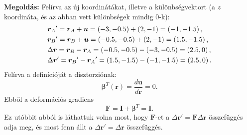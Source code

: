 \documentclass[12pt,a4paper]{scrartcl}
\let\mathbf\bm
\begin{document}
\textbf{Megoldás:} Felírva az új koordinátákat, illetve a különbségvektort (a $z$ koordináta, és az abban vett különbségek mindig 0-k):
\[\begin{gathered}
  {{\mathbf{r}}_A}' = {{\mathbf{r}}_A} + {\mathbf{u}} = \left( { - 3, - 0.5} \right) + \left( {2, - 1} \right) = \left( { - 1, - 1.5} \right), \hfill \\
  {{\mathbf{r}}_B}' = {{\mathbf{r}}_B} + {\mathbf{u}} = \left( { - 0.5, - 0.5} \right) + \left( {2, - 1} \right) = \left( {1.5, - 1.5} \right), \hfill \\
  \Delta {\mathbf{r}} = {{\mathbf{r}}_B} - {{\mathbf{r}}_A} = \left( { - 0.5, - 0.5} \right) - \left( { - 3, - 0.5} \right) = \left( {2.5,0} \right), \hfill \\
  \Delta {\mathbf{r}}' = {{\mathbf{r}}_B}' - {{\mathbf{r}}_A}' = \left( {1.5, - 1.5} \right) - \left( { - 1, - 1.5} \right) = \left( {2.5,0} \right). \hfill \\ 
\end{gathered} \]
Felírva a definícióját a disztorziónak:
\[{{\mathbf{\beta }}^T}\left( {\mathbf{r}} \right) = \frac{{d{\mathbf{u}}}}{{d{\mathbf{r}}}} = 0.\]
Ebből a deformációs gradiens \[{\mathbf{F}} = {\mathbf{I}} + {{\mathbf{\beta }}^T} = {\mathbf{I}}.\] Ez utóbbit abból is láthattuk volna most, hogy ${\mathbf{F}}$-et a $\Delta {\mathbf{r}}' = {\mathbf{F}}\Delta {\mathbf{r}}$ összefüggés adja meg, és most fenn állt a $\Delta {\mathbf{r}}' = \Delta {\mathbf{r}}$ összefüggés.
\normalsize
\end{document}
